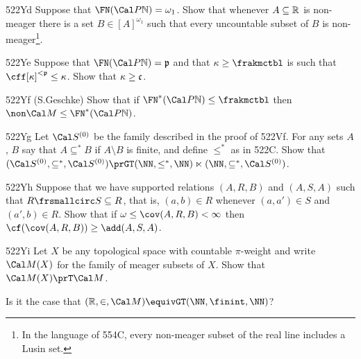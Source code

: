 {\spheader 522Yd Suppose that $\FN(\Cal P\Bbb N)=\omega_1$.   Show that
whenever $A\subseteq\Bbb R$ is non-meager there is a set
$B\in[A]^{\omega_1}$ such that every uncountable subset of $B$ is
non-meager\footnote{In the language of 554C, every non-meager subset of
the real line includes a Lusin set.}.

\spheader 522Ye Suppose that $\FN(\Cal P\Bbb N)=\frak p$ and that
$\kappa\ge\frakmctbl$ is such that $\cff[\kappa]^{<\frak p}\le\kappa$.
Show that $\kappa\ge\frak c$.

\spheader 522Yf (S.Geschke)
Show that if $\FN^*(\Cal P\Bbb N)\le\frakmctbl$ then
$\non\Cal M\le\FN^*(\Cal P\Bbb N)$.

\spheader 522Yg Let $\Cal S^{(0)}$ be the family described in the proof of
522Vf.   For any sets $A$, $B$ say that $A\subseteq^*B$ if $A\setminus B$
is finite, and define $\le^*$ as in 522C.   Show that
$(\Cal S^{(0)},\subseteq^*,\Cal S^{(0)})
\prGT(\NN,\le^*,\penalty-50\NN)\penalty-100\ltimes
(\NN,\subseteq^*,\Cal S^{(0)})$.

\spheader 522Yh Suppose that we have supported relations $(A,R,B)$ and
$(A,S,A)$ such that $R\frsmallcirc S\subseteq R$, that is,
$(a,b)\in R$ whenever $(a,a')\in S$ and $(a',b)\in R$.
Show that if $\omega\le\cov(A,R,B)<\infty$ then
$\cf(\cov(A,R,B))\ge\add(A,S,A)$.

\spheader 522Yi
Let $X$ be any topological space with countable
$\pi$-weight and write $\Cal M(X)$ for the family of meager subsets of
$X$.   Show that $\Cal M(X)\prT\Cal M$.
}%

 Is it the case that
$(\Bbb R,\in,\Cal M)\equivGT(\NN,\finint,\NN)$?   



